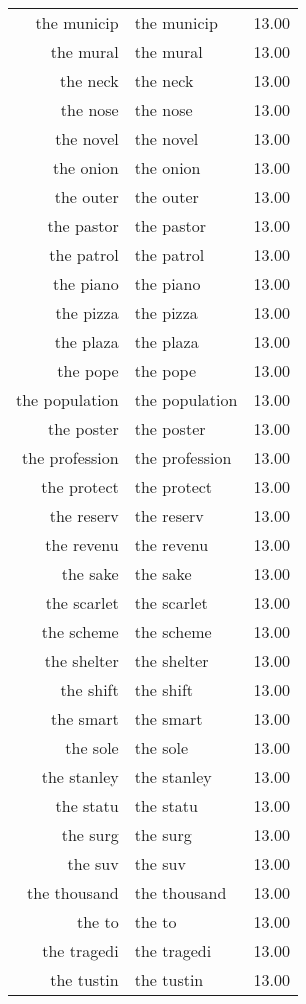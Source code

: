 \begin{table}[ht]
\begin{tabular}{rlr}
  the municip & the municip & 13.00 \\ 
  the mural & the mural & 13.00 \\ 
  the neck & the neck & 13.00 \\ 
  the nose & the nose & 13.00 \\ 
  the novel & the novel & 13.00 \\ 
  the onion & the onion & 13.00 \\ 
  the outer & the outer & 13.00 \\ 
  the pastor & the pastor & 13.00 \\ 
  the patrol & the patrol & 13.00 \\ 
  the piano & the piano & 13.00 \\ 
  the pizza & the pizza & 13.00 \\ 
  the plaza & the plaza & 13.00 \\ 
  the pope & the pope & 13.00 \\ 
  the population & the population & 13.00 \\ 
  the poster & the poster & 13.00 \\ 
  the profession & the profession & 13.00 \\ 
  the protect & the protect & 13.00 \\ 
  the reserv & the reserv & 13.00 \\ 
  the revenu & the revenu & 13.00 \\ 
  the sake & the sake & 13.00 \\ 
  the scarlet & the scarlet & 13.00 \\ 
  the scheme & the scheme & 13.00 \\ 
  the shelter & the shelter & 13.00 \\ 
  the shift & the shift & 13.00 \\ 
  the smart & the smart & 13.00 \\ 
  the sole & the sole & 13.00 \\ 
  the stanley & the stanley & 13.00 \\ 
  the statu & the statu & 13.00 \\ 
  the surg & the surg & 13.00 \\ 
  the suv & the suv & 13.00 \\ 
  the thousand & the thousand & 13.00 \\ 
  the to & the to & 13.00 \\ 
  the tragedi & the tragedi & 13.00 \\ 
  the tustin & the tustin & 13.00 \\ 

\end{tabular}
\end{table}
